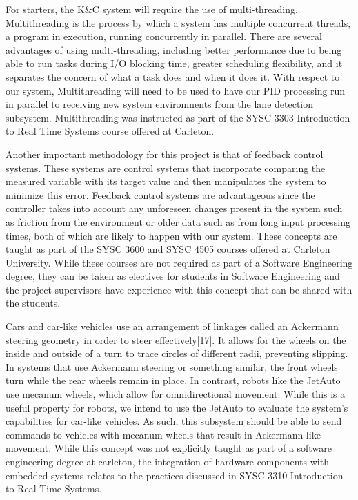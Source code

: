 \documentclass[titlepage,draft]{article}
\begin{document}
{For starters, the K\&C system will require the use of multi-threading. Multithreading is the process by which a system has multiple concurrent threads, a program in execution, running concurrently in parallel. There are several advantages of using multi-threading, including better performance due to being able to run tasks during I/O blocking time, greater scheduling flexibility, and it separates the concern of what a task does and when it does it. With respect to our system, Multithreading will need to be used to have our PID processing run in parallel to receiving new system environments from the lane detection subsystem. Multithreading was instructed as part of the SYSC 3303 Introduction to Real Time Systems course offered at Carleton.

Another important methodology for this project is that of feedback control systems. These systems are control systems that incorporate comparing the measured variable with its target value and then manipulates the system to minimize this error\cite{intro_to_feedback_sys}. Feedback control systems are advantageous since the controller takes into account any unforeseen changes present in the system such as friction from the environment or older data such as from long input processing times, both of which are likely to happen with our system\cite{intro_to_feedback_sys}. These concepts are taught as part of the SYSC 3600 and SYSC 4505 courses offered at Carleton University. While these courses are not required as part of a Software Engineering degree, they can be taken as electives for students in Software Engineering and the project supervisors have experience with this concept that can be shared with the students.

Cars and car-like vehicles use an arrangement of linkages called an Ackermann steering geometry in order to steer effectively[17]. It allows for the wheels on the inside and outside of a turn to trace circles of different radii, preventing slipping. In systems that use Ackermann steering or something similar, the front wheels turn while the rear wheels remain in place. In contrast, robots like the JetAuto use mecanum wheels, which allow for omnidirectional movement. While this is a useful property for robots, we intend to use the JetAuto to evaluate the system’s capabilities for car-like vehicles. As such, this subsystem should be able to send commands to vehicles with mecanum wheels that result in Ackermann-like movement. While this concept was not explicitly taught as part of a software engineering degree at carleton, the integration of hardware components with embedded systems relates to the practices discussed in SYSC 3310 Introduction to Real-Time Systems.

}
\end{document}
